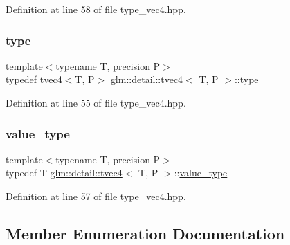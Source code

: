 Definition at line 58 of file type\+\_\+vec4.\+hpp.

\mbox{\label{structglm_1_1detail_1_1tvec4_a6f73aac80b830832bddd293627bd79b1}} 
\subsubsection{\texorpdfstring{type}{type}}
{\footnotesize\ttfamily template$<$typename T, precision P$>$ \\
typedef \hyperlink{structglm_1_1detail_1_1tvec4}{tvec4}$<$T, P$>$ \hyperlink{structglm_1_1detail_1_1tvec4}{glm\+::detail\+::tvec4}$<$ T, P $>$\+::\hyperlink{structglm_1_1detail_1_1tvec4_a6f73aac80b830832bddd293627bd79b1}{type}}



Definition at line 55 of file type\+\_\+vec4.\+hpp.

\mbox{\label{structglm_1_1detail_1_1tvec4_a9fefebb21a1ed7cdabd61fc4f0b8e28e}} 
\subsubsection{\texorpdfstring{value\+\_\+type}{value\_type}}
{\footnotesize\ttfamily template$<$typename T, precision P$>$ \\
typedef T \hyperlink{structglm_1_1detail_1_1tvec4}{glm\+::detail\+::tvec4}$<$ T, P $>$\+::\hyperlink{structglm_1_1detail_1_1tvec4_a9fefebb21a1ed7cdabd61fc4f0b8e28e}{value\+\_\+type}}



Definition at line 57 of file type\+\_\+vec4.\+hpp.



\subsection{Member Enumeration Documentation}
\mbox{\label{structglm_1_1detail_1_1tvec4_a931ed25f812335023097a513240ae102}} 
